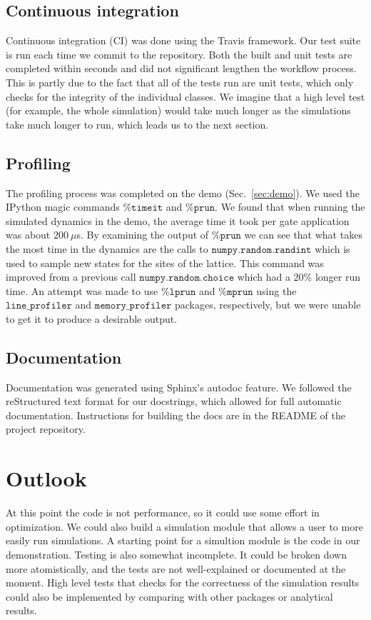 \documentclass{article}
\begin{document}
\subsection{Continuous integration}
\label{sec:ci}
Continuous integration (CI) was done using the Travis framework. Our test suite is run each time we commit to the repository.  Both the built and unit tests are completed within seconds and did not significant lengthen the workflow process.  This is partly due to the fact that all of the tests run are unit tests, which only checks for the integrity of the individual classes.  We imagine that a high level test (for example, the whole simulation) would take much longer as the simulations take much longer to run, which leads us to the next section.

\subsection{Profiling}
The profiling process was completed on the demo (Sec.~\ref{sec:demo}). We used the IPython magic commands $\texttt{\%timeit}$ and $\texttt{\%prun}$. We found that when running the simulated dynamics in the demo, the average time it took per gate application was about $200\ \mu$s. By examining the output of $\texttt{\%prun}$ we can see that what takes the most time in the dynamics are the calls to $\texttt{numpy.random.randint}$ which is used to sample new states for the sites of the lattice.  This command was improved from a previous call $\texttt{numpy.random.choice}$ which had a 20\% longer run time.  An attempt was made to use $\texttt{\%lprun}$ and $\texttt{\%mprun}$ using the $\texttt{line\_profiler}$ and $\texttt{memory\_profiler}$ packages, respectively, but we were unable to get it to produce a desirable output.

\subsection{Documentation}
Documentation was generated using Sphinx's autodoc feature. We followed the reStructured text format for our docstrings, which allowed for full automatic documentation. Instructions for building the docs are in the README of the project repository.

\section{Outlook}
At this point the code is not performance, so it could use some effort in optimization. We could also build a simulation module that allows a user to more easily run simulations. A starting point for a simultion module is the code in our demonstration. Testing is also somewhat incomplete. It could be broken down more atomistically, and the tests are not well-explained or documented at the moment.  High level tests that checks for the correctness of the simulation results could also be implemented by comparing with other packages or analytical results.
\end{document}
